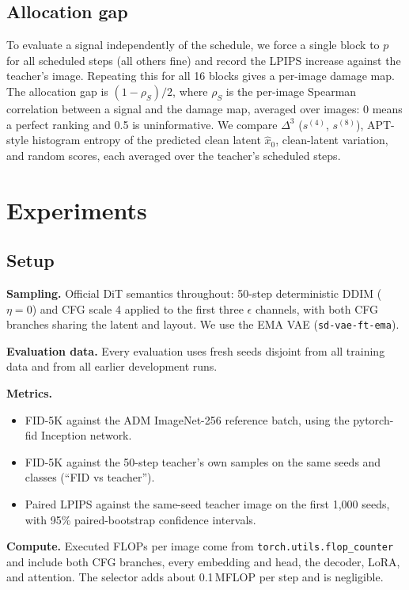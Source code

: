 \subsection{Allocation gap}
\label{sec:gap}
To evaluate a signal independently of the schedule, we force a single block to $p$ for all scheduled steps (all others fine) and record
the LPIPS increase against the teacher's image. Repeating this for all 16 blocks gives a per-image damage map. The allocation gap is
$(1-\rho_S)/2$, where $\rho_S$ is the per-image Spearman correlation between a signal and the damage map, averaged over images:
0 means a perfect ranking and 0.5 is uninformative. We compare $\Delta^3$ ($s^{(4)}$, $s^{(8)}$), APT-style histogram entropy of
the predicted clean latent $\hat x_0$, clean-latent variation, and random scores, each averaged over the teacher's scheduled steps.

\section{Experiments}
\label{sec:experiments}

\subsection{Setup}
\textbf{Sampling.} Official DiT semantics throughout: 50-step deterministic DDIM ($\eta{=}0$) and CFG scale 4 applied to the first three
$\epsilon$ channels, with both CFG branches sharing the latent and layout. We use the EMA VAE (\texttt{sd-vae-ft-ema}).

\textbf{Evaluation data.} Every evaluation uses fresh seeds disjoint from all training data and from all earlier development runs.

\textbf{Metrics.}
\begin{itemize}
  \item FID-5K against the ADM ImageNet-256 reference batch, using the pytorch-fid Inception network.
  \item FID-5K against the 50-step teacher's own samples on the same seeds and classes (``FID vs teacher'').
  \item Paired LPIPS against the same-seed teacher image on the first 1,000 seeds, with 95\% paired-bootstrap confidence intervals.
\end{itemize}

\textbf{Compute.} Executed FLOPs per image come from \texttt{torch.utils.flop\_counter} and include both CFG branches, every
embedding and head, the decoder, LoRA, and attention. The selector adds about 0.1\,MFLOP per step and is negligible.


